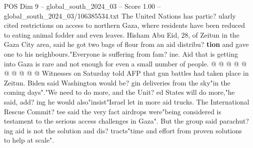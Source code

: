 \begin{textsample}{POS Dim 9 – global\_south\_2024\_03 – Score 1.00 – global\_south\_2024\_03/106385534.txt}
The United Nations has partic? ularly cited restrictions on access to northern Gaza, where residents have been reduced to eating animal fodder and even leaves.
Hisham Abu Eid, 28, of Zeitun in the Gaza City area, said he got two bags of flour from an aid distribu? \textbf{tion} and gave one to his neighbours."Everyone is suffering from fam? ine.
Aid that is getting into Gaza is rare and not enough for even a small number of people. @ @ @ @ @ @ @ @ @ @ Witnesses on Saturday told AFP that gun battles had taken place in Zeitun.
Biden said Washington would be? gin deliveries from the sky"in the coming days"."We need to do more, and the Unit? ed States will do more,"he said, add? ing he would also"insist"Israel let in more aid trucks.
The International Rescue Commit? tee said the very fact airdrops were"being considered is testament to the serious access challenges in Gaza".
But the group said parachut? ing aid is not the solution and dis? tracts"time and effort from proven solutions to help at scale".

\end{textsample}
